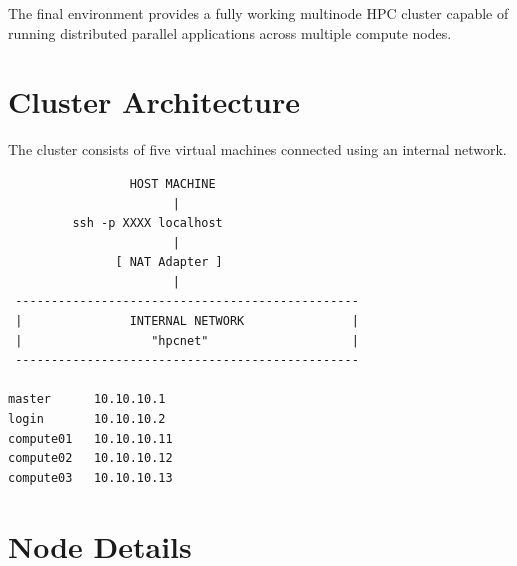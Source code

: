 \documentclass[11pt]{article}
\begin{document}
The final environment provides a fully working multinode HPC cluster
capable of running distributed parallel applications across multiple
compute nodes.
\section{Cluster Architecture}
\label{sec:org142b048}

The cluster consists of five virtual machines connected using an internal
network.

\begin{verbatim}
                 HOST MACHINE
                       |
         ssh -p XXXX localhost
                       |
               [ NAT Adapter ]
                       |
 ------------------------------------------------
 |               INTERNAL NETWORK               |
 |                  "hpcnet"                    |
 ------------------------------------------------

master      10.10.10.1
login       10.10.10.2
compute01   10.10.10.11
compute02   10.10.10.12
compute03   10.10.10.13
\end{verbatim}
\section{Node Details}
\label{sec:org44a408c}
\end{document}
